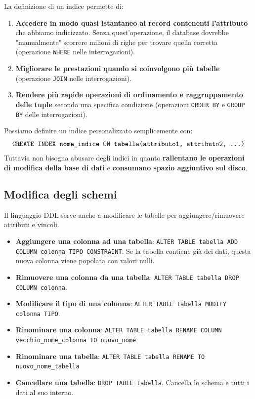 \documentclass[12pt]{report}
\begin{document}
	La definizione di un indice permette di:
	\begin{enumerate}
		\item \textbf{Accedere in modo quasi istantaneo ai record contenenti l'attributo} che abbiamo indicizzato. Senza quest'operazione, il database dovrebbe "manualmente" scorrere milioni di righe per trovare quella corretta (operazione \texttt{WHERE} nelle interrogazioni).
		
		\item \textbf{Migliorare le prestazioni quando si coinvolgono più tabelle} (operazione \texttt{JOIN} nelle interrogazioni).
		
		\item \textbf{Rendere più rapide operazioni di ordinamento e raggruppamento delle tuple} secondo una specifica condizione (operazioni \texttt{ORDER BY} e \texttt{GROUP BY} delle interrogazioni). 
	\end{enumerate}
	Possiamo definire un indice personalizzato semplicemente con:
	\[
	\text{\texttt{CREATE INDEX nome\_indice ON tabella(attributo1, attributo2, ...)}}
	\]
	Tuttavia non bisogna abusare degli indici in quanto \textbf{rallentano le operazioni di modifica della base di dati} e \textbf{consumano spazio aggiuntivo sul disco}.
	
	\subsection{Modifica degli schemi}
	Il linguaggio DDL serve anche a modificare le tabelle per aggiungere/rimuovere attributi e vincoli.
	
	\begin{itemize}
		
		\item \textbf{Aggiungere una colonna ad una tabella}: \texttt{ALTER TABLE tabella ADD COLUMN colonna TIPO CONSTRAINT}. Se la tabella contiene già dei dati, questa nuova colonna viene popolata con valori nulli.
		
		\item \textbf{Rimuovere una colonna da una tabella}: \texttt{ALTER TABLE tabella DROP COLUMN colonna}.
		
		\item \textbf{Modificare il tipo di una colonna}: \texttt{ALTER TABLE tabella MODIFY colonna TIPO}.
		
		\item \textbf{Rinominare una colonna}: \texttt{ALTER TABLE tabella RENAME COLUMN vecchio\_nome\_colonna TO nuovo\_nome}
		
		\item \textbf{Rinominare una tabella}: \texttt{ALTER TABLE tabella RENAME TO nuovo\_nome\_tabella}
		
		\item \textbf{Cancellare una tabella}: \texttt{DROP TABLE tabella}. Cancella lo schema e tutti i dati al suo interno.
		
	\end{itemize}
	
\end{document}
